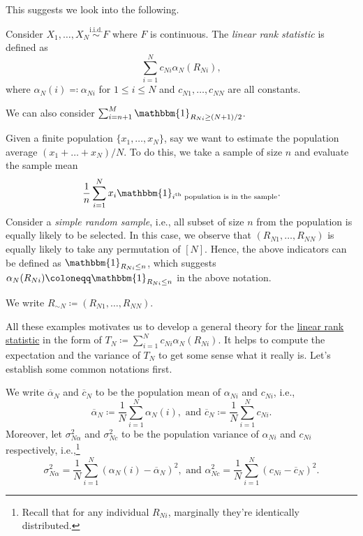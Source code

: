 This suggests we look into the following.

\begin{definition}\label{def:linrea-rank-statistic}
	Consider \(X_1, \dots , X_N \overset{\text{i.i.d.} }{\sim } F\) where \(F\) is continuous. The \emph{linear rank statistic} is defined as
	\[
		\sum_{i=1}^{N} c_{Ni} \alpha _N(R_{Ni}),
	\]
	where \(\alpha _N(i) \eqqcolon \alpha _{Ni}\) for \(1 \leq i \leq N\) and \(c_{N1}, \dots , c_{NN}\) are all constants.
\end{definition}

\begin{eg}
	We can also consider \(\sum_{i=n+1}^{M} \mathbbm{1}_{R_{Ni} \geq (N+1) / 2}\).
\end{eg}

\begin{eg}
	Given a finite population \(\{ x_1, \dots , x_N \} \), say we want to estimate the population average \((x_1 + \dots + x_N) / N\). To do this, we take a sample of size \(n\) and evaluate the sample mean
	\[
		\frac{1}{n} \sum_{i=1}^{N} x_i \mathbbm{1}_{\text{\(i^{\text{th} }\) population is in the sample} } .
	\]
	Consider a \emph{simple random sample}, i.e., all subset of size \(n\) from the population is equally likely to be selected. In this case, we observe that \((R_{N1}, \dots , R_{NN})\)  is equally likely to take any permutation of \([N]\). Hence, the above indicators can be defined as \(\mathbbm{1}_{R_{Ni} \leq n} \), which suggests \(\alpha _N(R_{Ni}) \coloneqq \mathbbm{1}_{R_{Ni} \leq n} \) in the above notation.
\end{eg}

\begin{notation}
	We write \(R_{\sim N} \coloneqq (R_{N1}, \dots , R_{NN})\).
\end{notation}

All these examples motivates us to develop a general theory for the \hyperref[def:linrea-rank-statistic]{linear rank statistic} in the form of \(T_N \coloneqq \sum_{i=1}^{N} c_{Ni} \alpha _N(R_{Ni})\). It helps to compute the expectation and the variance of \(T_N\) to get some sense what it really is. Let's establish some common notations first.

\begin{notation}
	We write \(\overline{\alpha} _N\) and \(\overline{c} _N\) to be the population mean of \(\alpha _{Ni}\) and \(c_{Ni}\), i.e.,
	\[
		\overline{\alpha} _N \coloneqq \frac{1}{N} \sum_{i=1}^{N} \alpha _N(i), \text{ and }
		\overline{c} _N \coloneqq \frac{1}{N} \sum_{i=1}^{N} c_{Ni}.
	\]
	Moreover, let \(\sigma _{N \alpha }^2\) and \(\sigma _{Nc}^2\) to be the population variance of \(\alpha _{Ni}\) and \(c_{Ni}\) respectively, i.e.,\footnote{Recall that for any individual \(R_{Ni}\), marginally they're identically distributed.}
	\[
		\sigma _{N \alpha }^2 = \frac{1}{N} \sum_{i=1}^{N} (\alpha _N(i) - \overline{\alpha} _N)^2, \text{ and }
		\alpha _{N c}^2 = \frac{1}{N} \sum_{i=1}^{N} (c_{Ni} - \overline{c} _N)^2.
	\]
\end{notation}

